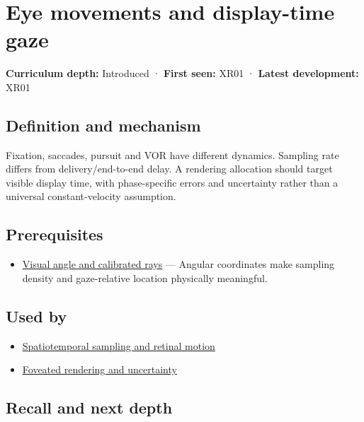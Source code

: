 \hypertarget{appendix-a6f2c4fe1996}{}\label{referencestart:appendix-a6f2c4fe1996}
\section{Eye movements and display-time gaze}\label{appendix-a6f2c4fe1996-eye-movements-and-display-time-gaze}

\textbf{Curriculum depth:} Introduced · \textbf{First seen:} XR01 · \textbf{Latest development:} XR01

\subsection{Definition and mechanism}\label{appendix-a6f2c4fe1996-definition-and-mechanism}

Fixation, saccades, pursuit and VOR have different dynamics. Sampling rate differs from delivery/end-to-end delay. A rendering allocation should target visible display time, with phase-specific errors and uncertainty rather than a universal constant-velocity assumption.

\subsection{Prerequisites}\label{appendix-a6f2c4fe1996-prerequisites}

\begin{itemize}
\tightlist
\item
  \hyperref[appendix-7d356c396d1a]{Visual angle and calibrated rays} --- Angular coordinates make sampling density and gaze-relative location physically meaningful.
\end{itemize}

\subsection{Used by}\label{appendix-a6f2c4fe1996-used-by}

\begin{itemize}
\tightlist
\item
  \hyperref[appendix-70895739febb]{Spatiotemporal sampling and retinal motion}
\item
  \hyperref[appendix-5878b813b732]{Foveated rendering and uncertainty}
\end{itemize}

\subsection{Recall and next depth}\label{appendix-a6f2c4fe1996-recall-and-next-depth}

